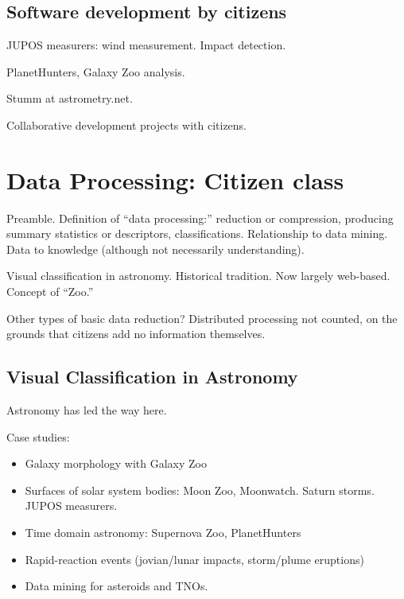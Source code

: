 \documentclass{ar2e}
\begin{document}

\subsection{Software development by citizens}
\label{sec:instr:software}

JUPOS measurers: wind measurement. 
Impact detection.

PlanetHunters, Galaxy Zoo analysis.

Stumm at astrometry.net.  

Collaborative development projects with citizens. 



\section{Data Processing: Citizen class}
\label{sec:class}

Preamble. Definition of ``data processing:'' reduction or compression, producing
summary statistics or descriptors, classifications. Relationship to data mining.
Data to knowledge (although not necessarily understanding).

Visual classification in astronomy. Historical tradition. Now largely web-based.
Concept of ``Zoo.'' 

Other types of basic data reduction? Distributed processing not counted, on the
grounds that citizens add no information themselves.


\subsection{Visual Classification in Astronomy}
\label{sec:class:astro}

Astronomy has led the way here.

Case studies:
\begin{itemize}
\item Galaxy morphology with Galaxy Zoo
\item Surfaces of solar system bodies: Moon Zoo, Moonwatch. Saturn storms. JUPOS
measurers.
\item Time domain astronomy: Supernova Zoo, PlanetHunters
\item Rapid-reaction events (jovian/lunar impacts, storm/plume eruptions)
\item Data mining for asteroids and TNOs.
\end{itemize}
\end{document}
